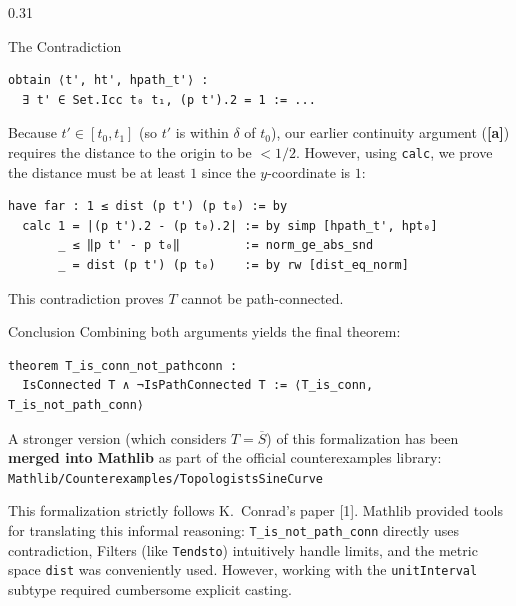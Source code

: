 \documentclass{beamer}
\begin{document}
\begin{frame}[t,fragile]
\begin{columns}[t]
\begin{column}{0.31\textwidth}
\begin{block}{The Contradiction}
                \begin{lstlisting}
obtain ⟨t', ht', hpath_t'⟩ : 
  ∃ t' ∈ Set.Icc t₀ t₁, (p t').2 = 1 := ...
\end{lstlisting}

                Because $t' \in [t_0, t_1]$ (so $t'$ is within $\delta$ of $t_0$), our earlier continuity argument (\textbf{\textcolor{UniBlue}{[a]}}) requires the distance to the origin to be $< 1/2$. However, using \texttt{calc}, we prove the distance must be at least $1$ since the $y$-coordinate is $1$:

                \begin{lstlisting}[language=lean]
have far : 1 ≤ dist (p t') (p t₀) := by
  calc 1 = |(p t').2 - (p t₀).2| := by simp [hpath_t', hpt₀]
       _ ≤ ‖p t' - p t₀‖         := norm_ge_abs_snd
       _ = dist (p t') (p t₀)    := by rw [dist_eq_norm]
\end{lstlisting}

                This contradiction proves $T$ cannot be path-connected.
            \end{block}

            \begin{block}{Conclusion}
                Combining both arguments yields the final theorem:

                \begin{lstlisting}
theorem T_is_conn_not_pathconn :
  IsConnected T ∧ ¬IsPathConnected T := ⟨T_is_conn, T_is_not_path_conn⟩
    \end{lstlisting}

                A stronger version (which considers $T = \overline{S}$) of this formalization has been \textbf{merged into
                    Mathlib} as part of the official counterexamples library:\\
                \texttt{Mathlib/Counterexamples/TopologistsSineCurve}

                \vspace{0.5em}

                This formalization strictly follows K.\ Conrad's paper [1].
                Mathlib provided tools for translating this informal reasoning:
                \texttt{T\_is\_not\_path\_conn} directly uses contradiction,
                Filters (like \texttt{Tendsto}) intuitively handle limits, and the metric space
                \texttt{dist} was conveniently used.
                However, working with the \texttt{unitInterval} subtype required cumbersome explicit casting.


\end{block}
\end{column}
\end{columns}
\end{frame}
\end{document}
